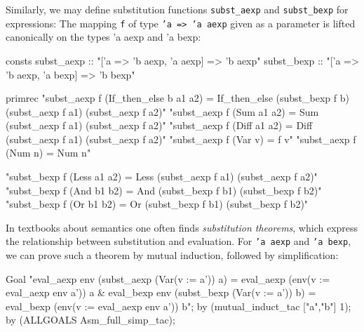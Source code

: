 Similarly, we may define substitution functions {\tt subst_aexp}
and {\tt subst_bexp} for expressions: The mapping {\tt f} of type
{\tt 'a => 'a aexp} given as a parameter is lifted canonically
on the types {'a aexp} and {'a bexp}:
\begin{ttbox}
consts
  subst_aexp :: "['a => 'b aexp, 'a aexp] => 'b aexp"
  subst_bexp :: "['a => 'b aexp, 'a bexp] => 'b bexp"

primrec
  "subst_aexp f (If_then_else b a1 a2) =
     If_then_else (subst_bexp f b) (subst_aexp f a1) (subst_aexp f a2)"
  "subst_aexp f (Sum a1 a2) = Sum (subst_aexp f a1) (subst_aexp f a2)"
  "subst_aexp f (Diff a1 a2) = Diff (subst_aexp f a1) (subst_aexp f a2)"
  "subst_aexp f (Var v) = f v"
  "subst_aexp f (Num n) = Num n"

  "subst_bexp f (Less a1 a2) = Less (subst_aexp f a1) (subst_aexp f a2)"
  "subst_bexp f (And b1 b2) = And (subst_bexp f b1) (subst_bexp f b2)"
  "subst_bexp f (Or b1 b2) = Or (subst_bexp f b1) (subst_bexp f b2)"
\end{ttbox}
In textbooks about semantics one often finds {\em substitution theorems},
which express the relationship between substitution and evaluation. For
\texttt{'a aexp} and \texttt{'a bexp}, we can prove such a theorem by mutual
induction, followed by simplification:
\begin{ttbox}
Goal
  "eval_aexp env (subst_aexp (Var(v := a')) a) =
     eval_aexp (env(v := eval_aexp env a')) a &
   eval_bexp env (subst_bexp (Var(v := a')) b) =
     eval_bexp (env(v := eval_aexp env a')) b";
by (mutual_induct_tac ["a","b"] 1);
by (ALLGOALS Asm_full_simp_tac);
\end{ttbox}

